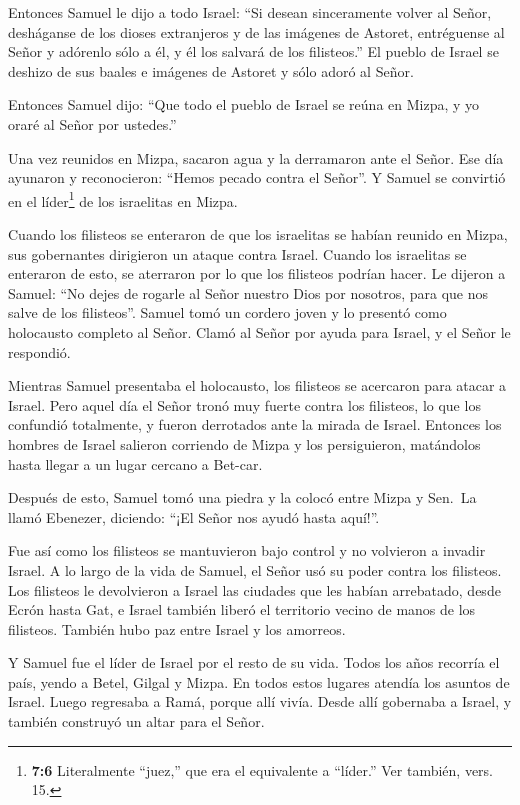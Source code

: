  Entonces Samuel le dijo a todo Israel: ``Si desean
sinceramente volver al Señor, desháganse de los dioses extranjeros y de
las imágenes de Astoret, entréguense al Señor y adórenlo sólo a él, y él
los salvará de los filisteos.''  El pueblo de Israel se
deshizo de sus baales e imágenes de Astoret y sólo adoró al Señor.

 Entonces Samuel dijo: ``Que todo el pueblo de Israel se
reúna en Mizpa, y yo oraré al Señor por ustedes.''

 Una vez reunidos en Mizpa, sacaron agua y la derramaron
ante el Señor. Ese día ayunaron y reconocieron: ``Hemos pecado contra el
Señor''. Y Samuel se convirtió en el líder\footnote{\textbf{7:6}
  Literalmente ``juez,'' que era el equivalente a ``líder.'' Ver
  también, vers. 15.} de los israelitas en Mizpa.

 Cuando los filisteos se enteraron de que los israelitas se
habían reunido en Mizpa, sus gobernantes dirigieron un ataque contra
Israel. Cuando los israelitas se enteraron de esto, se aterraron por lo
que los filisteos podrían hacer.  Le dijeron a Samuel: ``No
dejes de rogarle al Señor nuestro Dios por nosotros, para que nos salve
de los filisteos''.  Samuel tomó un cordero joven y lo
presentó como holocausto completo al Señor. Clamó al Señor por ayuda
para Israel, y el Señor le respondió.

 Mientras Samuel presentaba el holocausto, los filisteos se
acercaron para atacar a Israel. Pero aquel día el Señor tronó muy fuerte
contra los filisteos, lo que los confundió totalmente, y fueron
derrotados ante la mirada de Israel.  Entonces los hombres
de Israel salieron corriendo de Mizpa y los persiguieron, matándolos
hasta llegar a un lugar cercano a Bet-car.

 Después de esto, Samuel tomó una piedra y la colocó entre
Mizpa y Sen.~La llamó Ebenezer, diciendo: ``¡El Señor nos ayudó hasta
aquí!''.

 Fue así como los filisteos se mantuvieron bajo control y
no volvieron a invadir Israel. A lo largo de la vida de Samuel, el Señor
usó su poder contra los filisteos.  Los filisteos le
devolvieron a Israel las ciudades que les habían arrebatado, desde Ecrón
hasta Gat, e Israel también liberó el territorio vecino de manos de los
filisteos. También hubo paz entre Israel y los amorreos.

 Y Samuel fue el líder de Israel por el resto de su vida.
 Todos los años recorría el país, yendo a Betel, Gilgal y
Mizpa. En todos estos lugares atendía los asuntos de Israel.
 Luego regresaba a Ramá, porque allí vivía. Desde allí
gobernaba a Israel, y también construyó un altar para el Señor.

